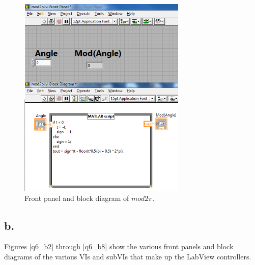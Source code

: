 \documentclass{article}
\theoremstyle{plain}
\theoremstyle{definition}
\theoremstyle{remark}
\begin{document}
\begin{figure}[htb]
\begin{center}
\includegraphics[width = 8cm]{q6_a.png}
\end{center}
\caption{Front panel and block diagram of $mod2\pi$.}
\label{q6_a}
\end{figure}

\clearpage

\subsection*{b.}

Figures \ref{q6_b2} through \ref{q6_b8} show the various front panels and block diagrams of the various VIs and subVIs that make up the LabView controllers.
\end{document}
